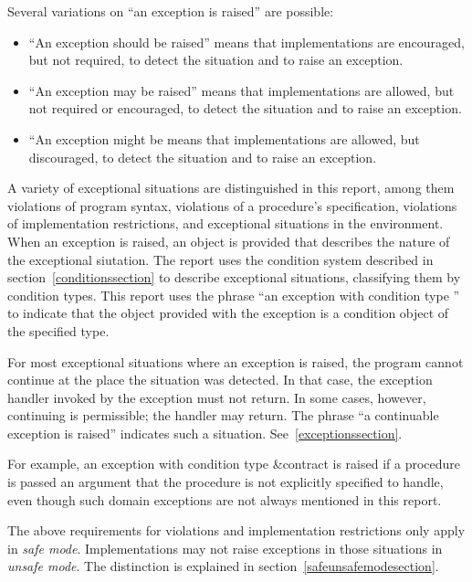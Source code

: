Several variations on ``an exception is raised'' are possible:

\begin{itemize}
\item ``An exception should be raised'' means that implementations
  are encouraged, but not required, to detect the situation
  and to raise an exception.

\item ``An exception may be raised'' means that implementations
are allowed, but not required or encouraged, to detect
the situation and to raise an exception.

\item ``An exception might be  means that implementations
are allowed, but discouraged, to detect the situation
and to raise an exception.
\end{itemize}

A variety of exceptional situations are distinguished in this report,
among them violations of program syntax, violations of a procedure's
specification, violations of implementation restrictions, and
exceptional situations in the environment.  When an exception is
raised, an object is provided that describes the nature of the
exceptional siutation.  The report uses the condition system described
in section~\ref{conditionssection} to describe exceptional situations,
classifying them by condition types.  This report uses the phrase
``an exception with condition type '' to indicate
that the object provided with the exception is a condition object of
the specified type.

For most exceptional situations where an exception is raised, the
program cannot continue at the place the situation was detected.  In
that case, the exception handler invoked by the exception must not
return.  In some cases, however, continuing is permissible; the
handler may return.  The phrase ``a continuable
exception is raised'' indicates such a situation.
See~\ref{exceptionssection}.

\vest For example, an exception with condition type {\cf\&contract}
is raised if a procedure is passed an argument that the procedure
is not explicitly specified to handle, even though such domain
exceptions are not always mentioned in this report.

The above requirements for violations and implementation restrictions
only apply in \textit{safe mode}.  Implementations may not raise
exceptions in those situations in \textit{unsafe mode}.  The
distinction is explained in section~\ref{safeunsafemodesection}.

